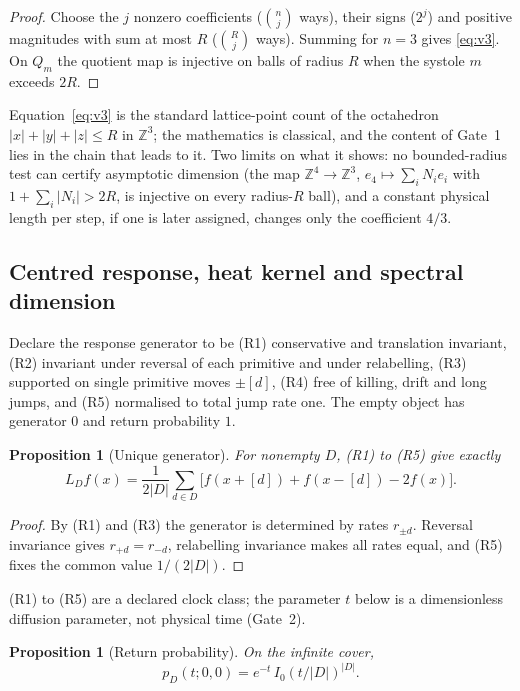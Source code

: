 \documentclass[11pt]{article}
\newtheorem{proposition}[theorem]{Proposition}
\theoremstyle{definition}
\theoremstyle{remark}
\newcommand{\Z}{\mathbb{Z}}
\begin{document}
\begin{proof}
Choose the $j$ nonzero coefficients ($\binom nj$ ways), their signs ($2^j$) and positive
magnitudes with sum at most $R$ ($\binom Rj$ ways). Summing for $n=3$ gives
\eqref{eq:v3}. On $Q_m$ the quotient map is injective on balls of radius $R$ when the
systole $m$ exceeds $2R$.
\end{proof}

Equation~\eqref{eq:v3} is the standard lattice-point count of the octahedron
$|x|+|y|+|z|\le R$ in $\Z^3$; the mathematics is classical, and the content of
Gate~1 lies in the chain that leads to it. Two limits on what it shows: no bounded-radius
test can certify asymptotic dimension (the map $\Z^4\to\Z^3$,
$e_4\mapsto\sum_iN_ie_i$ with $1+\sum_i|N_i|>2R$, is injective on every radius-$R$ ball),
and a constant physical length per step, if one is later assigned, changes only the
coefficient $4/3$.

\subsection{Centred response, heat kernel and spectral dimension}
\label{sec:heat}

Declare the response generator to be (R1) conservative and translation invariant,
(R2) invariant under reversal of each primitive and under relabelling, (R3) supported on
single primitive moves $\pm[d]$, (R4) free of killing, drift and long jumps, and (R5)
normalised to total jump rate one. The empty object has generator $0$ and return
probability $1$.

\begin{proposition}[Unique generator]
For nonempty $D$, (R1) to (R5) give exactly
\begin{equation}
L_Df(x)=\frac{1}{2|D|}\sum_{d\in D}\bigl[f(x+[d])+f(x-[d])-2f(x)\bigr].
\label{eq:generator}
\end{equation}
\end{proposition}

\begin{proof}
By (R1) and (R3) the generator is determined by rates $r_{\pm d}$. Reversal invariance
gives $r_{+d}=r_{-d}$, relabelling invariance makes all rates equal, and (R5) fixes the
common value $1/(2|D|)$.
\end{proof}

(R1) to (R5) are a declared clock class; the parameter $t$ below is a dimensionless
diffusion parameter, not physical time (Gate~2).

\begin{proposition}[Return probability]
On the infinite cover,
\begin{equation}
p_D(t;0,0)=e^{-t}\,I_0\!\left(t/|D|\right)^{|D|}.
\label{eq:heat}
\end{equation}
\end{proposition}
\end{document}
